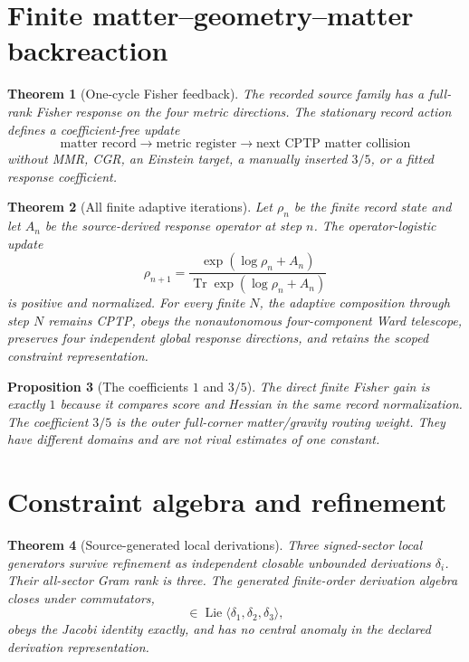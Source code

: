 \documentclass[11pt]{article}
\newtheorem{theorem}{Theorem}[section]
\newtheorem{proposition}[theorem]{Proposition}
\theoremstyle{definition}
\theoremstyle{remark}
\newcommand{\Tr}{\operatorname{Tr}}
\begin{document}
\section{Finite matter--geometry--matter backreaction}

\begin{theorem}[One-cycle Fisher feedback]
The recorded source family has a full-rank Fisher response on the four metric directions. The stationary record action defines a coefficient-free update
\begin{equation}
\text{matter record}\longrightarrow
\text{metric register}\longrightarrow
\text{next CPTP matter collision}
\end{equation}
without MMR, CGR, an Einstein target, a manually inserted $3/5$, or a fitted response coefficient.
\end{theorem}

\begin{theorem}[All finite adaptive iterations]
Let $\rho_n$ be the finite record state and let $A_n$ be the source-derived response operator at step $n$. The operator-logistic update
\begin{equation}
\rho_{n+1}
=\frac{\exp(\log\rho_n+A_n)}{\Tr\exp(\log\rho_n+A_n)}
\label{eq:logistic}
\end{equation}
is positive and normalized. For every finite $N$, the adaptive composition through step $N$ remains CPTP, obeys the nonautonomous four-component Ward telescope, preserves four independent global response directions, and retains the scoped constraint representation.
\end{theorem}

\begin{proposition}[The coefficients $1$ and $3/5$]
The direct finite Fisher gain is exactly $1$ because it compares score and Hessian in the same record normalization. The coefficient $3/5$ is the outer full-corner matter/gravity routing weight. They have different domains and are not rival estimates of one constant.
\end{proposition}

\section{Constraint algebra and refinement}

\begin{theorem}[Source-generated local derivations]
Three signed-sector local generators survive refinement as independent closable unbounded derivations $\delta_i$. Their all-sector Gram rank is three. The generated finite-order derivation algebra closes under commutators,
\begin{equation}
[\delta_i,\delta_j]\in\operatorname{Lie}\langle\delta_1,\delta_2,\delta_3\rangle,
\end{equation}
obeys the Jacobi identity exactly, and has no central anomaly in the declared derivation representation.
\end{theorem}
\end{document}
